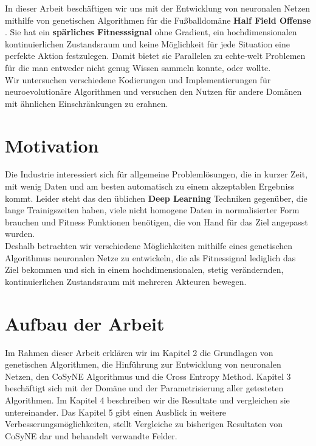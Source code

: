 In dieser Arbeit beschäftigen wir uns mit der Entwicklung von neuronalen Netzen mithilfe von genetischen Algorithmen für die Fußballdomäne \textbf{Half Field Offense} \cite{hfo}. Sie hat ein \textbf{spärliches Fitnesssignal} ohne Gradient, ein hochdimensionalen kontinuierlichen Zustandsraum und keine Möglichkeit für jede Situation eine perfekte Aktion festzulegen. Damit bietet sie Parallelen zu echte-welt Problemen für die man entweder nicht genug Wissen sammeln konnte, oder wollte.  \\

\noindent
Wir untersuchen verschiedene Kodierungen und Implementierungen für neuroevolutionäre Algorithmen und versuchen den Nutzen für andere Domänen mit ähnlichen Einschränkungen zu erahnen.\\


\newpage
\section{Motivation}

Die Industrie interessiert sich für allgemeine Problemlösungen, die in kurzer Zeit, mit wenig Daten und am besten automatisch zu einem akzeptablen Ergebniss kommt. Leider steht das den üblichen \textbf{Deep Learning} Techniken gegenüber, die lange Trainigszeiten haben, viele nicht homogene Daten in normalisierter Form brauchen und Fitness Funktionen benötigen, die von Hand für das Ziel angepasst wurden. \\

\noindent
Deshalb betrachten wir verschiedene Möglichkeiten mithilfe eines genetischen Algorithmus neuronalen Netze zu entwickeln, die als Fitnessignal lediglich das Ziel bekommen und sich in einem hochdimensionalen, stetig verändernden, kontinuierlichen Zustandsraum mit mehreren Akteuren bewegen.

\section{Aufbau der Arbeit}

Im Rahmen dieser Arbeit erklären wir im Kapitel 2 die Grundlagen von genetischen Algorithmen, die Hinführung zur Entwicklung von neuronalen Netzen, den CoSyNE Algorithmus und die Cross Entropy Method. Kapitel 3 beschäftigt sich mit der Domäne und der Parametrisierung aller getesteten Algorithmen. Im Kapitel 4 beschreiben wir die Resultate und vergleichen sie untereinander. Das Kapitel 5 gibt einen Ausblick in weitere Verbesserungsmöglichkeiten, stellt Vergleiche zu bisherigen Resultaten von CoSyNE dar und behandelt verwandte Felder.